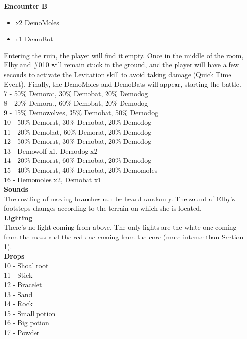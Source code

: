 \textbf{Encounter B}
\begin{itemize}
	\item x2 DemoMoles
	\item x1 DemoBat
\end{itemize}
Entering the ruin, the player will find it empty. Once in the middle of the room, Elby and \#010 will remain stuck in the ground, and the player will have a few seconds to activate the Levitation skill to avoid taking damage (Quick Time Event). Finally, the DemoMoles and DemoBats will appear, starting the battle.\\

7 - 50\% Demorat, 30\% Demobat, 20\% Demodog\\
8 - 20\% Demorat, 60\% Demobat, 20\% Demodog\\
9 - 15\% Demowolves, 35\% Demobat, 50\% Demodog\\
10 - 50\% Demorat, 30\% Demobat, 20\% Demodog\\
11 - 20\% Demobat, 60\% Demorat, 20\% Demodog\\
12 - 50\% Demorat, 30\% Demobat, 20\% Demodog\\
13 - Demowolf x1, Demodog x2\\
14 - 20\% Demorat, 60\% Demobat, 20\% Demodog\\
15 - 40\% Demorat, 40\% Demobat, 20\% Demomoles\\
16 - Demomoles x2, Demobat x1\\

\textbf{Sounds}\\
The rustling of moving branches can be heard randomly. The sound of Elby's footsteps changes according to the terrain on which she is located.\\

\textbf{Lighting}\\
There's no light coming from above. The only lights are the white one coming from the moss and the red one coming from the core (more intense than Section 1).\\

\textbf{Drops}\\
10 - Shoal root\\
11 - Stick\\
12 - Bracelet\\
13 - Sand\\
14 - Rock\\
15 - Small potion\\
16 - Big potion\\
17 - Powder\\

